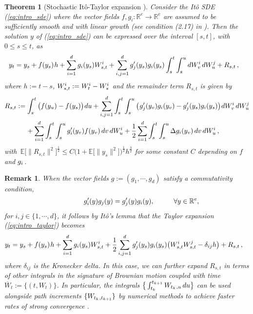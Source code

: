 \documentclass[sn-mathphys-num]{sn-jnl}%
\newtheorem{theorem}{Theorem}%
\newtheorem{remark}{Remark}%
\newcommand{\E}{\mathbb{E}}
\newcommand{\R}{\mathbb{R}}
\newcommand{\m}{\hspace{0.25mm}}
\newcommand{\mm}{\hspace{5mm}}
\begin{document}
\begin{theorem}[Stochastic It\^{o}-Taylor expansion {\cite[Equation (2.10) and Lemma 2.2.]{milstein2004numerics}}]\label{thm:intro_taylor} Consider the It\^{o} SDE (\ref{eq:intro_sde}) where the vector fields $f, g_i : \R^e \rightarrow\R^e$ are assumed to be sufficiently smooth and with linear growth (see condition (2.17) in \cite[Lemma 2.2.]{milstein2004numerics}).
Then the solution $y$ of (\ref{eq:intro_sde}) can be expressed over the interval $[s,t]$, with $0\leq s\leq t$, as
\begin{align}\label{eq:intro_taylor}
y_t & = y_s + f(y_s)\m h + \sum_{i=1}^d g_i(y_s)W_{s,t}^i + \sum_{i,j=1}^d g_j^\prime(y_s) g_i(y_s)\int_s^t\int_s^u dW_v^i\, dW_u^j + R_{s,t}\,,
\end{align}
where $h := t - s$, $W_{s,t}^{i} := W_t^i - W_s^i\m$ and the remainder term $R_{s,t}$ is given by
\begin{align*}
R_{s,t} & := \int_s^t \big(f(y_u) - f(y_s)\big)\m du + \sum_{i,j=1}^d \int_s^t \int_s^u \big(\m g_j^\prime(y_v)g_i(y_v) - g_j^\prime(y_s)g_i(y_s)\big)\m dW_v^i\, dW_u^j \\
&\mm + \sum_{i=1}^d\int_s^t \int_s^u g_i^\prime(y_v)f(y_v)\, dv\, dW_u^i + \frac{1}{2}\sum_{i=1}^d \int_s^t\int_s^u \Delta g_i(y_v)\, dv\, dW_u^i\,,
\end{align*}
with $\,\E\big[\|R_{s,t}\|^2\big]^\frac{1}{2} \leq C\big(1 + \E\big[\|y_s\|^2\big]\big)^\frac{1}{2} h^\frac{3}{2}$ for some constant $C$ depending on $f$ and $g_i\m$.
\end{theorem}\bigbreak
\begin{remark}\label{rmk:commute}
When the vector fields $g := (g_1,\cdots, g_d)$ satisfy a commutativity condition,
\begin{align}\label{eq:intro_commute}
\hspace*{15mm} g_i^\prime(y) g_j(y) = g_j^\prime(y) g_i(y),\hspace{10mm}\forall y\in\R^e,
\end{align}
for $i,j\in\{1,\cdots, d\}$, it follows by It\^{o}'s lemma that the Taylor expansion (\ref{eq:intro_taylor}) becomes
\begin{align*}
y_t & = y_s + f(y_s)\m h + \sum_{i=1}^d g_i(y_s)W_{s,t}^i + \frac{1}{2}\sum_{i,j=1}^d g_j^\prime(y_s) g_i(y_s)\big(W_{s,t}^i W_{s,t}^j - \delta_{ij}h\big) + R_{s,t}\,,
\end{align*}
where $\delta_{ij}$ is the Kronecker delta. In this case, we can further expand $R_{s,t}$ in terms of other integrals in the signature of Brownian motion coupled with time $\overline{W}_t := \{(t, W_t)\}$.
In particular, the integrals $\big\{\int_{t_k}^{t_{k+1}} W_{t_k\m,u}\, du\big\}$ can be used alongside path increments $\{W_{t_k\m,t_{k+1}}\}$ by numerical methods to achieve faster rates of strong convergence \cite{foster2024splitting, tang2019sdes}.
\end{remark}\bigbreak
\end{document}
